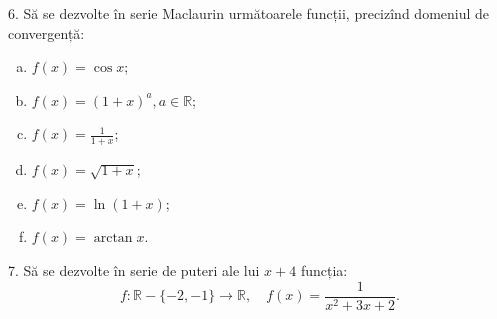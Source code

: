 \documentclass[11pt,a4paper]{article}
\newcommand\RR{\mathbb{R}}
\theoremstyle{dotless}
\theoremstyle{dotlessdr}
\begin{document}
\vspace{1cm}

6. Să se dezvolte în serie Maclaurin următoarele funcții, precizînd domeniul
de convergență:
\begin{enumerate}[(a)]
\item $f(x) = \cos x$;
\item $f(x) = (1 + x)^a, a \in \RR$;
\item $f(x) = \frac{1}{1 + x}$;
\item $f(x) = \sqrt{1 + x}$;
\item $f(x) = \ln ( 1 + x)$;
\item $f(x) = \arctan x$.
\end{enumerate}

\vspace{1cm}

7. Să se dezvolte în serie de puteri ale lui $x + 4$ funcția:
\[
  f: \RR - \{ -2, -1 \} \to \RR, \quad %
  f(x) = \frac{1}{x^2 + 3x + 2}.
\]
\end{document}
